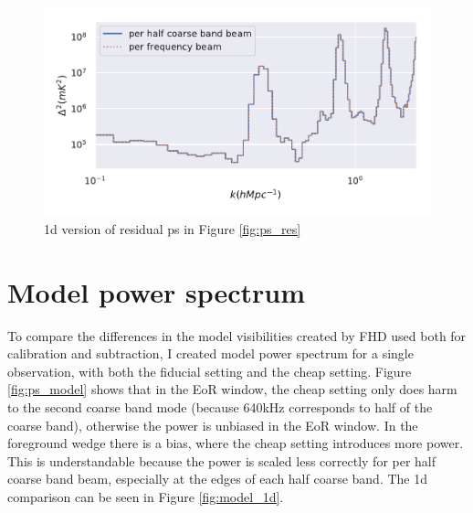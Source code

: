 \documentclass[10pt]{extarticle}
\begin{document}
\begin{figure}
    \centering
    \includegraphics[width=\linewidth]{beam_ps_residual.pdf}
    \caption{1d version of residual ps in Figure \ref{fig:ps_res}}
    \label{fig:res_1d}
\end{figure}

\section{Model power spectrum}
To compare the differences in the model visibilities created by FHD used both for calibration and subtraction, I created model power spectrum for a single observation, with both the fiducial setting and the cheap setting. Figure \ref{fig:ps_model} shows that in the EoR window, the cheap setting only does harm to the second coarse band mode (because 640kHz corresponds to half of the coarse band), otherwise the power is unbiased in the EoR window. In the foreground wedge there is a bias, where the cheap setting introduces more power. This is understandable because the power is scaled less correctly for per half coarse band beam, especially at the edges of each half coarse band. The 1d comparison can be seen in Figure \ref{fig:model_1d}.
\end{document}
